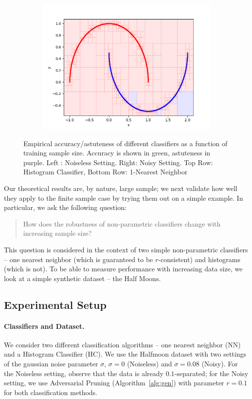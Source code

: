 \begin{figure}
\begin{subfigure}{0.31\textwidth}
 \includegraphics[width=\linewidth]{visual3000}

\end{subfigure}

\caption{Empirical accuracy/astuteness of different classifiers as a function of training sample size. Accuracy is shown in green, astuteness in purple. Left : Noiseless Setting. Right: Noisy Setting. Top Row: Histogram Classifier, Bottom Row: 1-Nearest Neighbor} \label{fig:1}
\end{figure}

Our theoretical results are, by nature, large sample; we next validate how well they apply to the finite sample case by trying them out on a simple example. In particular, we ask the following question:

\begin{quote}
How does the robustness of non-parametric classifiers change with increasing sample size?
\end{quote}

This question is considered in the context of two simple non-parametric classifiers -- one nearest neighbor (which is guaranteed to be $r$-consistent) and histograms (which is not). To be able to measure performance with increasing data size, we look at a simple synthetic dataset -- the Half Moons. 

\subsection{Experimental Setup}

\paragraph{Classifiers and Dataset.} We consider two different classification algorithms -- one nearest neighbor (NN) and a Histogram Classifier (HC).  We use the Halfmoon dataset with two settings of the gaussian noise parameter $\sigma$, $\sigma = 0$ (Noiseless) and $\sigma =0.08$ (Noisy). For the Noiseless setting, observe that the data is already $0.1$-separated; for the Noisy setting, we use Adversarial Pruning (Algorithm~\ref{alg:gen}) with parameter $r = 0.1$ for both classification methods.

